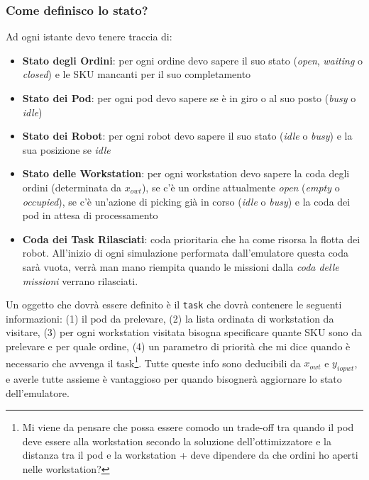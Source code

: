 \documentclass{article}
\begin{document}
\subsubsection{Come definisco lo \textbf{stato}?} 
Ad ogni istante devo tenere traccia di:
\begin{itemize}
    \item \textbf{Stato degli Ordini}: per ogni ordine devo sapere il suo stato (\emph{open}, \emph{waiting} o \emph{closed}) e le SKU mancanti per il suo completamento
    \item \textbf{Stato dei Pod}: per ogni pod devo sapere se è in giro o al suo posto (\emph{busy} o \emph{idle})
    \item \textbf{Stato dei Robot}: per ogni robot devo sapere il suo stato (\emph{idle} o \emph{busy}) e la sua posizione se \emph{idle} 
    \item \textbf{Stato delle Workstation}: per ogni workstation devo sapere la coda degli ordini (determinata da $x_{owt}$), se c'è un ordine attualmente \emph{open} (\emph{empty} o \emph{occupied}), se c'è un'azione di picking già in corso (\emph{idle} o \emph{busy}) e la coda dei pod in attesa di processamento
    \item \textbf{Coda dei Task Rilasciati}: coda prioritaria che ha come risorsa la flotta dei robot. All'inizio di ogni simulazione performata dall'emulatore questa coda sarà vuota, verrà man mano riempita quando le missioni dalla \emph{coda delle missioni} verrano rilasciati.
\end{itemize}

Un oggetto che dovrà essere definito è il \texttt{task} che dovrà contenere le seguenti informazioni: (1) il pod da prelevare, (2) la lista ordinata di workstation da visitare, (3) per ogni workstation visitata bisogna specificare quante SKU sono da prelevare e per quale ordine, (4) un parametro di priorità che mi dice quando è necessario che avvenga il task\footnote{Mi viene da pensare che possa essere comodo un trade-off tra quando il pod deve essere alla workstation secondo la soluzione dell'ottimizzatore e la distanza tra il pod e la workstation + deve dipendere da che ordini ho aperti nelle workstation?}. 
Tutte queste info sono deducibili da $x_{owt}$ e $y_{iopwt}$, e averle tutte assieme è vantaggioso per quando bisognerà aggiornare lo stato dell'emulatore.
\end{document}
